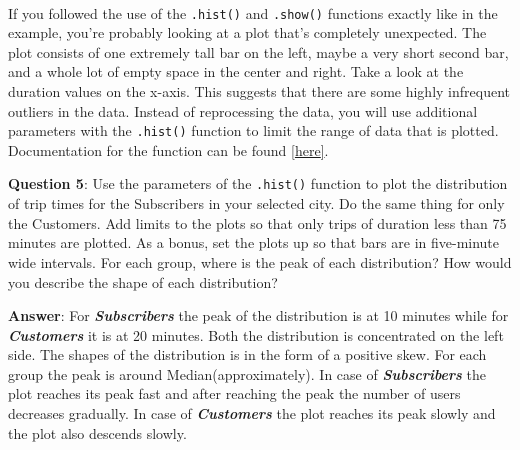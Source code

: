 \documentclass[11pt]{article}
\begin{document}
    \begin{center}
    \end{center}
    { \hspace*{\fill} \\}
    
    If you followed the use of the \texttt{.hist()} and \texttt{.show()}
functions exactly like in the example, you're probably looking at a plot
that's completely unexpected. The plot consists of one extremely tall
bar on the left, maybe a very short second bar, and a whole lot of empty
space in the center and right. Take a look at the duration values on the
x-axis. This suggests that there are some highly infrequent outliers in
the data. Instead of reprocessing the data, you will use additional
parameters with the \texttt{.hist()} function to limit the range of data
that is plotted. Documentation for the function can be found
\href{https://matplotlib.org/devdocs/api/_as_gen/matplotlib.pyplot.hist.html\#matplotlib.pyplot.hist}{{[}here{]}}.

\textbf{Question 5}: Use the parameters of the \texttt{.hist()} function
to plot the distribution of trip times for the Subscribers in your
selected city. Do the same thing for only the Customers. Add limits to
the plots so that only trips of duration less than 75 minutes are
plotted. As a bonus, set the plots up so that bars are in five-minute
wide intervals. For each group, where is the peak of each distribution?
How would you describe the shape of each distribution?

\textbf{Answer}: For \textbf{\emph{Subscribers}} the peak of the
distribution is at 10 minutes while for \textbf{\emph{Customers}} it is
at 20 minutes. Both the distribution is concentrated on the left side.
The shapes of the distribution is in the form of a positive skew. For
each group the peak is around Median(approximately). In case of
\textbf{\emph{Subscribers}} the plot reaches its peak fast and after
reaching the peak the number of users decreases gradually. In case of
\textbf{\emph{Customers}} the plot reaches its peak slowly and the plot
also descends slowly.
\end{document}
